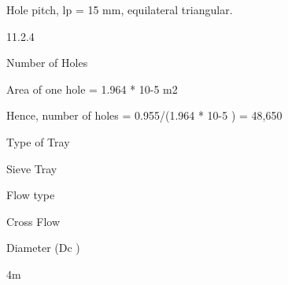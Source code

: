 \documentclass[a4paper,portrait,12pt]{article}
\begin{document}
\begin{flushleft}
Hole pitch, lp = 15 mm, equilateral triangular.
\end{flushleft}





11.2.4





\begin{flushleft}
Number of Holes
\end{flushleft}





\begin{flushleft}
Area of one hole = 1.964 * 10-5 m2
\end{flushleft}


\begin{flushleft}
Hence, number of holes = 0.955/(1.964 * 10-5 ) = 48,650
\end{flushleft}





\begin{flushleft}
Type of Tray
\end{flushleft}





\begin{flushleft}
Sieve Tray
\end{flushleft}





\begin{flushleft}
Flow type
\end{flushleft}





\begin{flushleft}
Cross Flow
\end{flushleft}





\begin{flushleft}
Diameter (Dc )
\end{flushleft}





\begin{flushleft}
4m
\end{flushleft}
\end{document}
